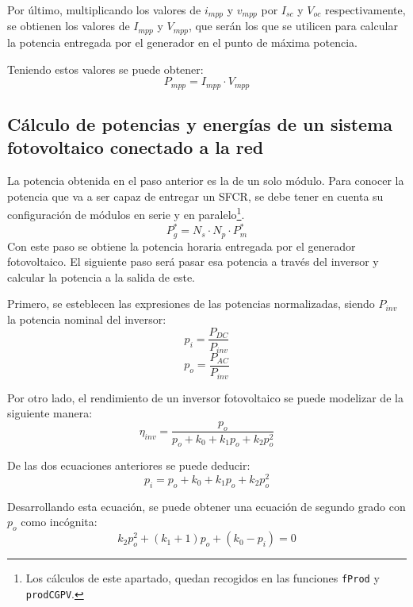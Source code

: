 Por último, multiplicando los valores de \(i_{mpp}\) y \(v_{mpp}\) por \(I_{sc}\) y \(V_{oc}\) respectivamente, se obtienen los valores de \(I_{mpp}\) y \(V_{mpp}\), que serán los que se utilicen para calcular la potencia entregada por el generador en el punto de máxima potencia.

Teniendo estos valores se puede obtener:
\begin{equation}
P_{mpp}=I_{mpp}\cdot V_{mpp}
\end{equation}

\subsection{Cálculo de potencias y energías de un sistema fotovoltaico conectado a la red}
\label{sec:org887ad53}
\label{subsec:calculo-potencias-energias}
La potencia obtenida en el paso anterior es la de un solo módulo. Para conocer la potencia que va a ser capaz de entregar un SFCR, se debe tener en cuenta su configuración de módulos en serie y en paralelo\footnote{Los cálculos de este apartado, quedan recogidos en las funciones \texttt{fProd} y \texttt{prodCGPV}.}.
\begin{equation}
P_g^*=N_s\cdot N_p\cdot P_m^*
\end{equation}
Con este paso se obtiene la potencia horaria entregada por el generador fotovoltaico. El siguiente paso será pasar esa potencia a través del inversor y calcular la potencia a la salida de este.

Primero, se esteblecen las expresiones de las potencias normalizadas, siendo \(P_{inv}\) la potencia nominal del inversor:
\begin{equation}
p_i=\frac{P_{DC}}{P_{inv}}
\end{equation}
\begin{equation}
p_o=\frac{P_{AC}}{P_{inv}}
\end{equation}

Por otro lado, el rendimiento de un inversor fotovoltaico se puede modelizar de la siguiente manera:
\begin{equation}
\eta_{inv}=\frac{p_o}{p_o+k_0+k_1p_o+k_2p_o^2}
\end{equation}

De las dos ecuaciones anteriores se puede deducir:
\begin{equation}
p_i=p_o+k_0+k_1p_o+k_2p_o^2
\end{equation}

Desarrollando esta ecuación, se puede obtener una ecuación de segundo grado con \(p_o\) como incógnita:
\begin{equation}
k_2p_o^2+(k_1+1)p_o+(k_0-p_i)=0
\end{equation}

